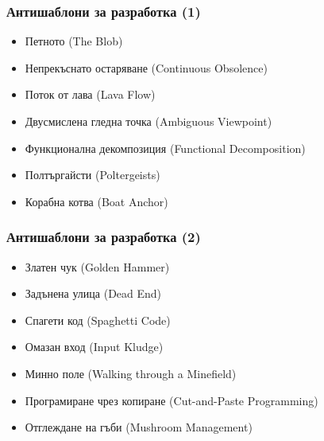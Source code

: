 \documentclass[alsotrans]{beamerswitch}
\begin{document}
\begin{frame}
  \frametitle{Антишаблони за разработка (1)}
  
  \begin{itemize}[<+->]
  \item Петното (The Blob)
  \item Непрекъснато остаряване (Continuous Obsolence)
  \item Поток от лава (Lava Flow)
  \item Двусмислена гледна точка (Ambiguous Viewpoint)
  \item Функционална декомпозиция (Functional Decomposition)
  \item Полтъргайсти (Poltergeists)
  \item Корабна котва (Boat Anchor)
  \end{itemize}
\end{frame}

\begin{frame}
  \frametitle{Антишаблони за разработка (2)}
  
  \begin{itemize}[<+->]
  \item Златен чук (Golden Hammer)
  \item Задънена улица (Dead End)
  \item Спагети код (Spaghetti Code)
  \item Омазан вход (Input Kludge)
  \item Минно поле (Walking through a Minefield)
  \item Програмиране чрез копиране (Cut-and-Paste Programming)
  \item Отглеждане на гъби (Mushroom Management)
  \end{itemize}
\end{frame}
\end{document}
